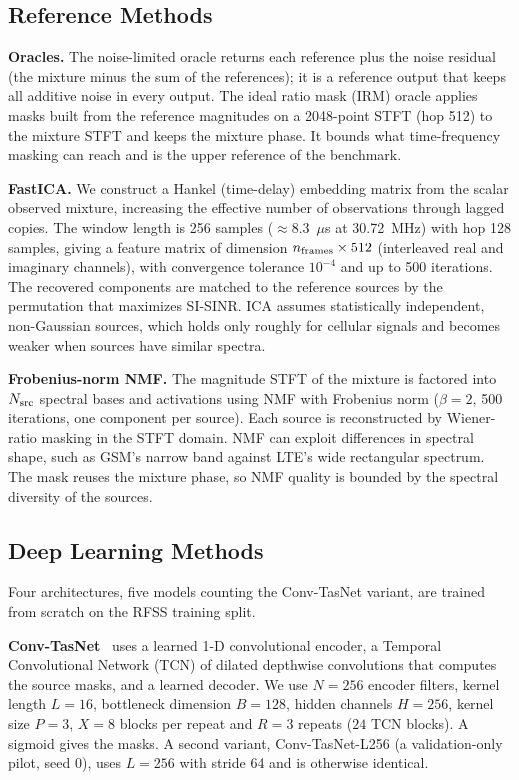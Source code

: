 \documentclass[journal]{IEEEtran}
\begin{document}
\subsection{Reference Methods}

\textbf{Oracles.} The noise-limited oracle returns each reference plus the noise
residual (the mixture minus the sum of the references); it is a reference output
that keeps all additive noise in every output. The ideal ratio mask (IRM) oracle
applies masks built from the
reference magnitudes on a 2048-point STFT (hop 512) to the mixture STFT and keeps
the mixture phase. It bounds what time-frequency masking can reach and is the
upper reference of the benchmark.

\textbf{FastICA.} We construct a Hankel (time-delay) embedding matrix
from the scalar observed mixture, increasing the effective number of
observations through lagged copies. The window length is 256 samples
($\approx\!8.3$~$\mu$s at 30.72~MHz) with hop 128 samples, giving a
feature matrix of dimension $n_{\rm frames} \times 512$ (interleaved real
and imaginary channels), with convergence tolerance $10^{-4}$ and up to
500 iterations. The recovered components are matched to the reference sources by
the permutation that maximizes SI-SINR. ICA assumes statistically independent,
non-Gaussian sources, which holds only roughly for cellular signals and becomes
weaker when sources have similar spectra.

\textbf{Frobenius-norm NMF.} The magnitude STFT of the mixture is
factored into $N_{\rm src}$ spectral bases and activations
using NMF with Frobenius norm ($\beta\!=\!2$, 500 iterations, one component per
source). Each source is reconstructed by Wiener-ratio masking in the STFT domain.
NMF can exploit differences in spectral shape, such as GSM's narrow band against
LTE's wide rectangular spectrum. The mask reuses the mixture phase, so NMF quality is
bounded by the spectral diversity of the sources.

\subsection{Deep Learning Methods}

Four architectures, five models counting the Conv-TasNet variant, are trained from scratch on the RFSS training split.

\textbf{Conv-TasNet}~\cite{luo2019conv} uses a learned 1-D convolutional
encoder, a Temporal Convolutional Network (TCN) of dilated depthwise
convolutions that computes the source masks, and a learned decoder. We use
$N\!=\!256$ encoder filters, kernel length $L\!=\!16$, bottleneck dimension
$B\!=\!128$, hidden channels $H\!=\!256$, kernel size $P\!=\!3$, $X\!=\!8$
blocks per repeat and $R\!=\!3$ repeats ($24$ TCN blocks). A sigmoid gives the
masks. A second variant, Conv-TasNet-L256 (a validation-only pilot, seed 0), uses $L\!=\!256$ with stride 64 and is
otherwise identical.
\end{document}
